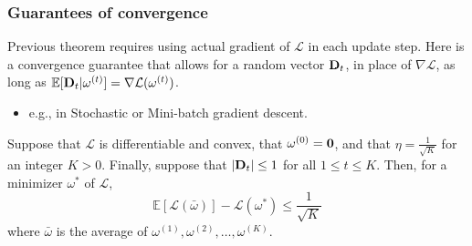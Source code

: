 \documentclass{beamer}
\theoremstyle{example}
\begin{document}
\begin{frame}
    \frametitle{Guarantees of convergence}
    Previous theorem requires using actual gradient of $\mathcal L$ in each update step. Here is a convergence guarantee that allows for a random vector ${\bf D}_t$, in place of $\nabla\mathcal L$, as long as $\mathbb E[{\bf D}_t | \omega^{(t)}] = \nabla\mathcal L(\omega^{(t)})$. 
    \begin{itemize}
        \item e.g., in Stochastic or Mini-batch gradient descent.
    \end{itemize}

    \pause
    \begin{theorem}Suppose that $\mathcal L$ is differentiable and convex, that $\omega^{(0)} = {\bf 0}$, and that $\eta = \frac{1}{\sqrt{K}}$ for an integer $K > 0$. Finally, suppose that $|{\bf D}_t| \le 1$ for all $1\le t\le K$. Then, for a minimizer $\omega^*$ of $\mathcal L$,
            \[\mathbb E[\mathcal L(\bar\omega)] - \mathcal L(\omega^*) \le \frac{1}{\sqrt{K}}\]
    where $\bar\omega$ is the average of $\omega^{(1)}, \omega^{(2)}, \ldots, \omega^{(K)}$.
    \end{theorem}
\end{frame}
\end{document}
